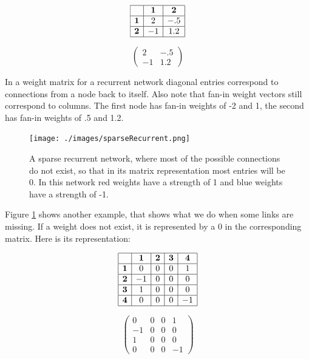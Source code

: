 \begin{minipage}{0.5\textwidth}
\centering
\[
\begin{array}{|c|c|c|}
\hline
\multicolumn{1}{|c|}{} & \textbf{1} & \textbf{2} \\
\hline
\textbf{1} & 2 & -.5 \\
\hline
\textbf{2} & -1 & 1.2 \\
\hline
\end{array}
\]
\end{minipage}
\begin{minipage}{0.5\textwidth}
\centering
\[
\begin{pmatrix}
 2  &  -.5 \\
 -1  & 1.2 
\end{pmatrix}
\]
\end{minipage}
\vspace*{.1cm} 

\noindent In a weight matrix for a recurrent network diagonal entries correspond to connections from a node back to itself. Also note that fan-in weight vectors still correspond to columns. The first node has fan-in weights of -2 and 1, the second has fan-in weights of .5 and 1.2.

\begin{figure}[h]
\centering
\texttt{[image: ./images/sparseRecurrent.png]}
\caption[Jeff Yoshimi.]{A sparse recurrent network, where most of the possible connections do not exist, so that in its matrix representation most entries will be 0. In this network red weights have a strength of 1 and blue weights have a strength of -1.} 
\label{sparseRecurrent}
\end{figure}

Figure \ref{sparseRecurrent} shows another example, that shows what we do when some links are missing. If a weight does not exist, it is represented by a $0$ in the corresponding matrix. Here is its representation:

\begin{minipage}{0.5\textwidth}
\centering
\[
\begin{array}{|c|c|c|c|c|}
\hline
\multicolumn{1}{|c|}{} & \textbf{1} & \textbf{2}  & \textbf{3} & \textbf{4} \\
\hline
\textbf{1} & 0 & 0 & 0 & 1 \\
\hline
\textbf{2} & -1 & 0 & 0 & 0 \\
\hline
\textbf{3} & 1 & 0 & 0 & 0 \\
\hline
\textbf{4} & 0 & 0 & 0 & -1 \\
\hline
\end{array}
\]
\end{minipage}
\begin{minipage}{0.5\textwidth}
\centering
\[
\begin{pmatrix}
0 & 0 & 0 & 1 \\
-1 & 0 & 0 & 0 \\
1 & 0 & 0 & 0 \\
0 & 0 & 0 & -1
\end{pmatrix}
\]
\end{minipage}
\vspace*{.1cm} 

